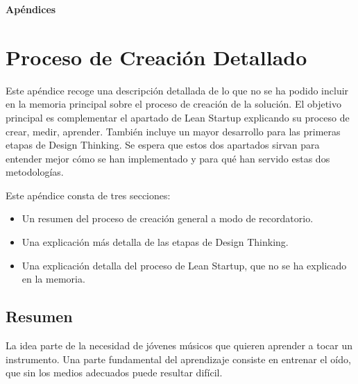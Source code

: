 \documentclass[12pt,twoside,titlepage]{report}
\newcommand\blankpage{%
    \newpage
    \null
    \thispagestyle{empty}%
    \newpage}
\begin{document}
{%

{}
\footnotesize{
%


}
\raggedbottom
\afterpage{\blankpage}
\newpage



\appendix
{}
{}
\mbox{}
\vfill
\begin{center}
\begin{Huge}
\textbf{Apéndices}
\end{Huge}
\end{center}
\vfill
\mbox{}
\thispagestyle{empty}
\newpage
\mbox{}
\thispagestyle{empty}
\newpage


\chapter{Proceso de Creación Detallado}
Este apéndice recoge una descripción detallada de lo que no se ha podido incluir en la memoria principal sobre el proceso de creación de la solución. El objetivo principal es complementar el apartado de Lean Startup explicando su proceso de crear, medir, aprender. También incluye un mayor desarrollo para las primeras etapas de Design Thinking. Se espera que estos dos apartados sirvan para entender mejor cómo se han implementado y para qué han servido estas dos metodologías. 

Este apéndice consta de tres secciones:

\begin{itemize}
    \item Un resumen del proceso de creación general a modo de recordatorio.
    \item Una explicación más detalla de las etapas de Design Thinking.
    \item Una explicación detalla del proceso de Lean Startup, que no se ha explicado en la memoria.
\end{itemize}

\section{Resumen}
La idea parte de la necesidad de jóvenes músicos que quieren aprender a tocar un instrumento. Una parte fundamental del aprendizaje consiste en entrenar el oído, que sin los medios adecuados puede resultar difícil.

}
\end{document}
